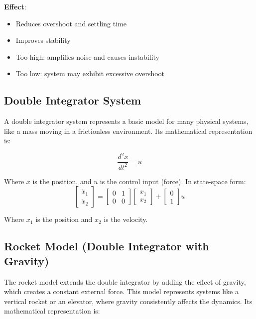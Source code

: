 \documentclass[12pt]{article}
\begin{document}
\textbf{Effect}:
\begin{itemize}
    \item Reduces overshoot and settling time 
    \item Improves stability 
    \item Too high: amplifies noise and causes instability 
    \item Too low: system may exhibit excessive overshoot 
\end{itemize}

\subsection{Double Integrator System}
A double integrator system represents a basic model for many physical systems, like a mass moving in a frictionless environment.  Its mathematical representation is: 

\begin{equation}
\frac{d^2x}{dt^2} = u
\end{equation}

Where $x$ is the position, and $u$ is the control input (force).  In state-space form: 
\begin{equation}
\begin{bmatrix} \dot{x}_1 \\ \dot{x}_2 \end{bmatrix} = 
\begin{bmatrix} 0 & 1 \\ 0 & 0 \end{bmatrix}
\begin{bmatrix} x_1 \\ x_2 \end{bmatrix} + 
\begin{bmatrix} 0 \\ 1 \end{bmatrix} u
\end{equation}

Where $x_1$ is the position and $x_2$ is the velocity.  

\subsection{Rocket Model (Double Integrator with Gravity)}
The rocket model extends the double integrator by adding the effect of gravity, which creates a constant external force.  This model represents systems like a vertical rocket or an elevator, where gravity consistently affects the dynamics.  Its mathematical representation is: 
\end{document}
